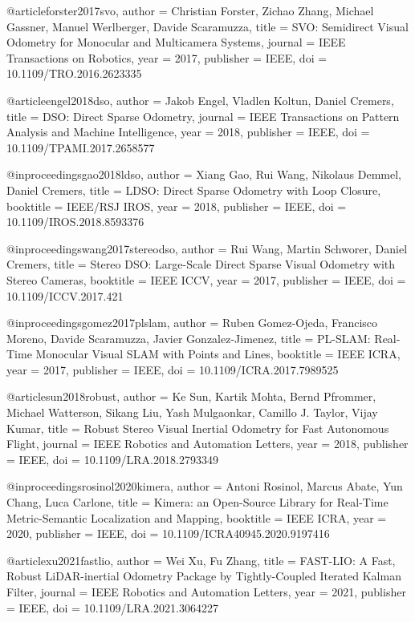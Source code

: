@article{forster2017svo,
  author = {Christian Forster, Zichao Zhang, Michael Gassner, Manuel Werlberger, Davide Scaramuzza},
  title = {SVO: Semidirect Visual Odometry for Monocular and Multicamera Systems},
  journal = {IEEE Transactions on Robotics},
  year = {2017},
  publisher = {IEEE},
  doi = {10.1109/TRO.2016.2623335}
}

@article{engel2018dso,
  author = {Jakob Engel, Vladlen Koltun, Daniel Cremers},
  title = {DSO: Direct Sparse Odometry},
  journal = {IEEE Transactions on Pattern Analysis and Machine Intelligence},
  year = {2018},
  publisher = {IEEE},
  doi = {10.1109/TPAMI.2017.2658577}
}

@inproceedings{gao2018ldso,
  author = {Xiang Gao, Rui Wang, Nikolaus Demmel, Daniel Cremers},
  title = {LDSO: Direct Sparse Odometry with Loop Closure},
  booktitle = {IEEE/RSJ IROS},
  year = {2018},
  publisher = {IEEE},
  doi = {10.1109/IROS.2018.8593376}
}

@inproceedings{wang2017stereodso,
  author = {Rui Wang, Martin Schworer, Daniel Cremers},
  title = {Stereo DSO: Large-Scale Direct Sparse Visual Odometry with Stereo Cameras},
  booktitle = {IEEE ICCV},
  year = {2017},
  publisher = {IEEE},
  doi = {10.1109/ICCV.2017.421}
}

@inproceedings{gomez2017plslam,
  author = {Ruben Gomez-Ojeda, Francisco Moreno, Davide Scaramuzza, Javier Gonzalez-Jimenez},
  title = {PL-SLAM: Real-Time Monocular Visual SLAM with Points and Lines},
  booktitle = {IEEE ICRA},
  year = {2017},
  publisher = {IEEE},
  doi = {10.1109/ICRA.2017.7989525}
}

@article{sun2018robust,
  author = {Ke Sun, Kartik Mohta, Bernd Pfrommer, Michael Watterson, Sikang Liu, Yash Mulgaonkar, Camillo J. Taylor, Vijay Kumar},
  title = {Robust Stereo Visual Inertial Odometry for Fast Autonomous Flight},
  journal = {IEEE Robotics and Automation Letters},
  year = {2018},
  publisher = {IEEE},
  doi = {10.1109/LRA.2018.2793349}
}

@inproceedings{rosinol2020kimera,
  author = {Antoni Rosinol, Marcus Abate, Yun Chang, Luca Carlone},
  title = {Kimera: an Open-Source Library for Real-Time Metric-Semantic Localization and Mapping},
  booktitle = {IEEE ICRA},
  year = {2020},
  publisher = {IEEE},
  doi = {10.1109/ICRA40945.2020.9197416}
}

@article{xu2021fastlio,
  author = {Wei Xu, Fu Zhang},
  title = {FAST-LIO: A Fast, Robust LiDAR-inertial Odometry Package by Tightly-Coupled Iterated Kalman Filter},
  journal = {IEEE Robotics and Automation Letters},
  year = {2021},
  publisher = {IEEE},
  doi = {10.1109/LRA.2021.3064227}
}

